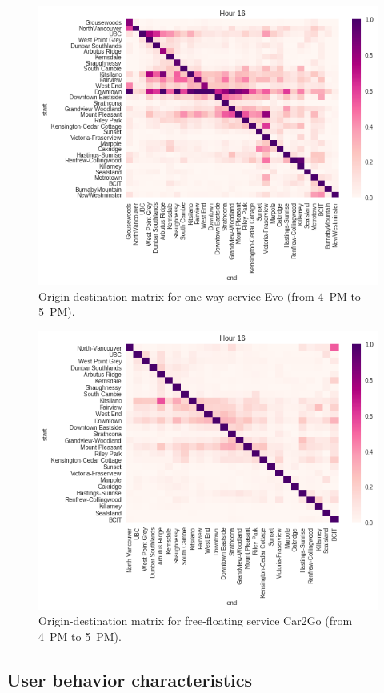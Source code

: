 \begin{figure}[tbh]
\centering
\includegraphics[width=0.85\columnwidth]{destination_matrix/hour16.png}
\caption{Origin-destination matrix for one-way service Evo (from 4~PM to 5~PM).}
\label{fig:4_4_matrixEvo}
\end{figure}
%
\begin{figure}[tbh]
\centering
\includegraphics[width=0.85\columnwidth]{car2go_destination_matrix/hour16.png}
\caption{Origin-destination matrix for free-floating service Car2Go (from 4~PM to 5~PM).}
\label{fig:4_4_matrixCar2Go}
\end{figure}




\subsection{User behavior characteristics}
\label{sec:4_4_user-behavior}


